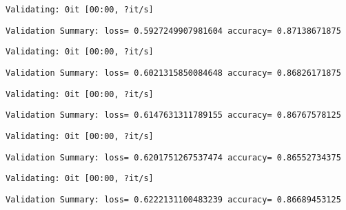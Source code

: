 \documentclass[11pt]{article}
\begin{document}
    
    \begin{Verbatim}[commandchars=\\\{\}]
Validating: 0it [00:00, ?it/s]
    \end{Verbatim}

    
    \begin{Verbatim}[commandchars=\\\{\}]
Validation Summary: loss= 0.5927249907981604 accuracy= 0.87138671875
    \end{Verbatim}

    
    \begin{Verbatim}[commandchars=\\\{\}]
Validating: 0it [00:00, ?it/s]
    \end{Verbatim}

    
    \begin{Verbatim}[commandchars=\\\{\}]
Validation Summary: loss= 0.6021315850084648 accuracy= 0.86826171875
    \end{Verbatim}

    
    \begin{Verbatim}[commandchars=\\\{\}]
Validating: 0it [00:00, ?it/s]
    \end{Verbatim}

    
    \begin{Verbatim}[commandchars=\\\{\}]
Validation Summary: loss= 0.6147631311789155 accuracy= 0.86767578125
    \end{Verbatim}

    
    \begin{Verbatim}[commandchars=\\\{\}]
Validating: 0it [00:00, ?it/s]
    \end{Verbatim}

    
    \begin{Verbatim}[commandchars=\\\{\}]
Validation Summary: loss= 0.6201751267537474 accuracy= 0.86552734375
    \end{Verbatim}

    
    \begin{Verbatim}[commandchars=\\\{\}]
Validating: 0it [00:00, ?it/s]
    \end{Verbatim}

    
    \begin{Verbatim}[commandchars=\\\{\}]
Validation Summary: loss= 0.6222131100483239 accuracy= 0.86689453125
    \end{Verbatim}
\end{document}
